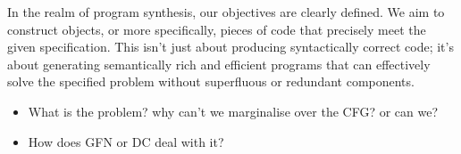 In the realm of program synthesis, our objectives are clearly defined. We aim to construct objects, or more specifically, pieces of code that precisely meet the given specification. This isn't just about producing syntactically correct code; it's about generating semantically rich and efficient programs that can effectively solve the specified problem without superfluous or redundant components.







\begin{itemize}
    \item What is the problem? why can't we marginalise over the CFG? or can we? 
    \item How does GFN or DC deal with it? 
\end{itemize}


